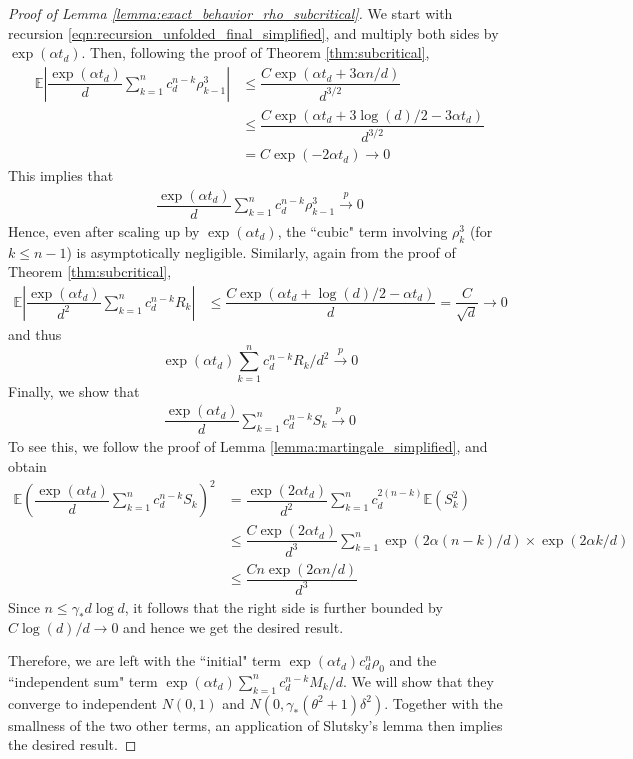 \documentclass[12pt]{article}
\newcommand{\E}{\mathbb{E}}
\begin{document}
\medskip

\begin{proof}[Proof of Lemma \ref{lemma:exact_behavior_rho_subcritical}]
    We start with recursion \ref{eqn:recursion_unfolded_final_simplified}, and multiply both sides by $\exp(\alpha t_d)$. Then, following the proof of Theorem \ref{thm:subcritical},
    \begin{align*}
        \E\left|\dfrac{\exp(\alpha t_d)}{d}\sum_{k=1}^n c_d^{n-k}\rho^3_{k-1}\right|&\leq \dfrac{C\exp(\alpha t_d+3\alpha n/d)}{d^{3/2}}\\
        &\leq \dfrac{C\exp(\alpha t_d + 3\log(d)/2-3\alpha t_d)}{d^{3/2}}\\
        &=C\exp(-2\alpha t_d)\to 0
    \end{align*}This implies that 
    \begin{align*}
        \dfrac{\exp(\alpha t_d)}{d}\sum_{k=1}^n c_d^{n-k}\rho^3_{k-1}\stackrel{p}{\to}0
    \end{align*}
    Hence, even after scaling up by $\exp(\alpha t_d)$, the ``cubic" term involving $\rho_k^3$ (for $k\leq n-1$) is asymptotically negligible. Similarly, again from the proof of Theorem \ref{thm:subcritical},
    \begin{align*}
        \E\left|\dfrac{\exp(\alpha t_d)}{d^2}\sum_{k=1}^n c_d^{n-k}R_k\right| &\leq \dfrac{C\exp(\alpha t_d+\log(d)/2-\alpha t_d)}{d}= \dfrac{C}{\sqrt{d}}\to 0
    \end{align*}and thus $$\exp(\alpha t_d)\sum_{k=1}^n c_d^{n-k}R_k/d^2\stackrel{p}{\to}0$$
    Finally, we show that
    \begin{align*}
        \dfrac{\exp(\alpha t_d)}{d}\sum_{k=1}^n c_d^{n-k}S_k\stackrel{p}{\to}0
    \end{align*}To see this, we follow the proof of Lemma \ref{lemma:martingale_simplified}, and obtain
    \begin{align*}
        \E\left(\dfrac{\exp(\alpha t_d)}{d}\sum_{k=1}^n c_d^{n-k}S_k\right)^2 &= \dfrac{\exp(2\alpha t_d)}{d^2}\sum_{k=1}^n c_d^{2(n-k)}\E(S_k^2)\\
        &\leq \dfrac{C\exp(2\alpha t_d)}{d^3}\sum_{k=1}^n \exp(2\alpha(n-k)/d)\times \exp(2\alpha k/d)\\
        &\leq \dfrac{Cn\exp(2\alpha n/d)}{d^3}
    \end{align*}Since $n\leq \gamma_*d\log d$, it follows that the right side is further bounded by $C\log(d)/d\to 0$ and hence we get the desired result.

    Therefore, we are left with the ``initial" term $\exp(\alpha t_d)c_d^n\rho_0$ and the ``independent sum" term $\exp(\alpha t_d)\sum_{k=1}^n c_d^{n-k}M_k/d$. We will show that they converge to independent $N(0,1)$ and $N(0, \gamma_*(\theta^2+1)\delta^2)$. Together with the smallness of the two other terms, an application of Slutsky's lemma then implies the desired result.


\end{proof}
\end{document}
